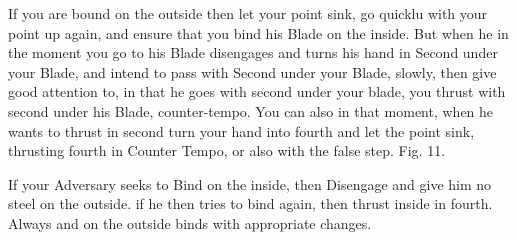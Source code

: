 \newpage


\newpage

\exercise{}

If you are bound on the outside then let your point sink, go quicklu with your point up again, and ensure that you bind his Blade on the inside. But when he in the moment you go to his Blade disengages and turns his hand in Second under your Blade, and intend to pass with Second under your Blade, slowly, then give good attention to, in that he goes with second under your blade, you thrust with second under his Blade, counter-tempo. You can also in that moment, when he wants to thrust in second turn your hand into fourth and let the point sink, thrusting fourth in Counter Tempo, or also with the false step. Fig. 11.


\exercise{}


If your Adversary seeks to Bind on the inside, then Disengage and give him no steel on the outside. if he then tries to bind again, then thrust inside in fourth. Always and on the outside binds with appropriate changes.

\exercise{}


